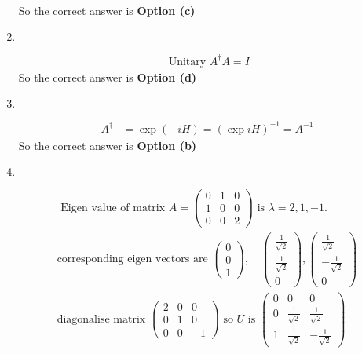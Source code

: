 \begin{enumerate}
\begin{answer}
\begin{align*}
		\end{align*}
		So the correct answer is \textbf{Option (c)}
	\end{answer}
	\item $\left. \right. $	
	\begin{answer}
		\begin{align*}
	\text{	Unitary }A^{\dagger} A=I
		\end{align*}
		So the correct answer is \textbf{Option (d)}
	\end{answer}
	\item $\left. \right. $		
	\begin{answer}
		\begin{align*}
		A^{\dagger}&=\exp (-i H)=(\exp i H)^{-1}=A^{-1}
		\end{align*}
	So the correct answer is \textbf{Option (b)}
	\end{answer}
		\item $\left. \right. $	
	\begin{answer}
		\begin{align*}
	\text{	Eigen value of matrix }A=\left(\begin{array}{lll}0 & 1 & 0 \\ 1 & 0 & 0 \\ 0 & 0 & 2\end{array}\right)\text{ is }\lambda=2,1,-1.\\
	\text{corresponding eigen vectors are }\left(\begin{array}{l}0 \\ 0 \\ 1\end{array}\right), \quad\left(\begin{array}{c}\frac{1}{\sqrt{2}} \\ \frac{1}{\sqrt{2}} \\ 0\end{array}\right),\left(\begin{array}{c}\frac{1}{\sqrt{2}} \\ -\frac{1}{\sqrt{2}} \\ 0\end{array}\right)\\
	\text{diagonalise matrix }\left(\begin{array}{ccc}2 & 0 & 0 \\ 0 & 1 & 0 \\ 0 & 0 & -1\end{array}\right)\text{ so $U$ is }\left(\begin{array}{ccc}0 & 0 & 0 \\ 0 & \frac{1}{\sqrt{2}} & \frac{1}{\sqrt{2}} \\ 1 & \frac{1}{\sqrt{2}} & -\frac{1}{\sqrt{2}}\end{array}\right)

\end{align*}
\end{answer}
\end{enumerate}
